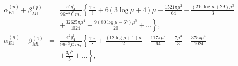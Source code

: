\documentclass[12pt,preprint,tightenlines,
showpacs,preprintnumbers,amsmath,amssymb,
a4paper,nofootinbib]{revtex4-1}
\def\bea{\begin{eqnarray}}
\def\eea{\end{eqnarray}}
\def\nn{\nonumber}
\begin{document}
\bea
\alpha_{E1}^{(p)}+\beta_{M1}^{(p)} &=& 
  \frac{e^2 g_A^2}{96\pi^3 f_\pi^2\, m_\pi} \left\{  \frac{11 \pi }{8} + 6  (3 \log \mu +4)\mu - \frac{1521 \pi \mu^2}{64} -\frac{ (210 \log \mu + 29)\mu^3 }{3  } \right. \\ 
&&\left.+ \frac{ 32625 \pi \mu^4 }{1024 }+ \frac{ 9 (80 \log \mu - 67)\mu^5 }{20  }+\dots\right\},\nn\\
\alpha_{E1}^{(n)}+\beta_{M1}^{(n)} &=& 
 \frac{e^2 g_A^2}{96\pi^3 f_\pi^2\, m_\pi} \left\{  \frac{11 \pi}{8} + \frac{ (12 \log \mu +1)\mu}{2} - \frac{117 \pi \mu^2}{64} +\frac{ 7 \mu^3 }{3 } - \frac{ 375\pi \mu^4 }{1024 }\right. \\
 &&\left.+ \frac{ 3 \mu^5 }{5 }+\dots\right\},\nn
\eea
\end{document}
